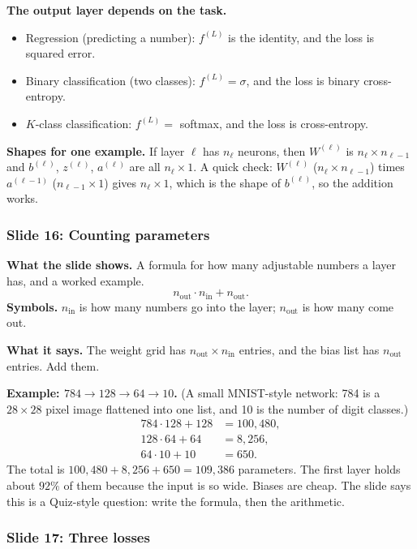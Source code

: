 \textbf{The output layer depends on the task.}
\begin{itemize}
\item Regression (predicting a number): $f^{(L)}$ is the identity, and the loss is squared error.
\item Binary classification (two classes): $f^{(L)}=\sigma$, and the loss is binary cross-entropy.
\item $K$-class classification: $f^{(L)}=$ softmax, and the loss is cross-entropy.
\end{itemize}

\textbf{Shapes for one example.} If layer $\ell$ has $n_\ell$ neurons, then $W^{(\ell)}$ is $n_\ell\times n_{\ell-1}$ and $b^{(\ell)}$, $z^{(\ell)}$, $a^{(\ell)}$ are all $n_\ell\times1$. A quick check: $W^{(\ell)}$ ($n_\ell\times n_{\ell-1}$) times $a^{(\ell-1)}$ ($n_{\ell-1}\times1$) gives $n_\ell\times1$, which is the shape of $b^{(\ell)}$, so the addition works.

\subsubsection{Slide 16: Counting parameters}

\textbf{What the slide shows.} A formula for how many adjustable numbers a layer has, and a worked example.
\[
n_{\text{out}}\cdot n_{\text{in}} + n_{\text{out}}.
\]
\textbf{Symbols.} $n_{\text{in}}$ is how many numbers go into the layer; $n_{\text{out}}$ is how many come out.

\textbf{What it says.} The weight grid has $n_{\text{out}}\times n_{\text{in}}$ entries, and the bias list has $n_{\text{out}}$ entries. Add them.

\textbf{Example: $784\to128\to64\to10$.} (A small MNIST-style network: 784 is a $28\times28$ pixel image flattened into one list, and 10 is the number of digit classes.)
\[
\begin{aligned}
784\cdot128+128 &= 100{,}480,\\
128\cdot64+64 &= 8{,}256,\\
64\cdot10+10 &= 650.
\end{aligned}
\]
The total is $100{,}480+8{,}256+650 = 109{,}386$ parameters. The first layer holds about $92\%$ of them because the input is so wide. Biases are cheap. The slide says this is a Quiz-style question: write the formula, then the arithmetic.

\subsubsection{Slide 17: Three losses}

